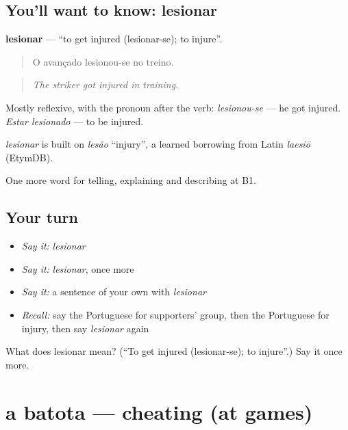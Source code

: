 \subsection*{You'll want to know: lesionar}
\textbf{lesionar} — \textquotedblleft{}to get injured (lesionar-se); to injure\textquotedblright{}.

\begin{quote}
O avançado lesionou-se no treino.
\end{quote}

\begin{quote}
\emph{The striker got injured in training.}
\end{quote}

Mostly reflexive, with the pronoun after the verb: \emph{lesionou-se} — he got injured. \emph{Estar lesionado} — to be injured.

\begin{cousinweb}
\emph{lesionar} is built on \emph{lesão} \textquotedblleft{}injury\textquotedblright{}, a learned borrowing from Latin \emph{laesiō} (EtymDB).
\end{cousinweb}

\begin{grammarlens}[title={What you've built}]
One more word for telling, explaining and describing at B1.
\end{grammarlens}

\subsection*{Your turn}
\begin{itemize}
\raggedright
  \item \emph{Say it:} \emph{lesionar}
  \item \emph{Say it:} \emph{lesionar}, once more
  \item \emph{Say it:} a sentence of your own with \emph{lesionar}
  \item \emph{Recall:} say the Portuguese for supporters' group, then the Portuguese for injury, then say \emph{lesionar} again
\end{itemize}

\begin{tcolorbox}[breakable,colback=teal!4,colframe=teal!35!black,title={Before you move on}]
What does lesionar mean? (\textquotedblleft{}To get injured (lesionar-se); to injure\textquotedblright{}.) Say it once more.
\end{tcolorbox}
\section[a batota]{a batota — cheating (at games)}

